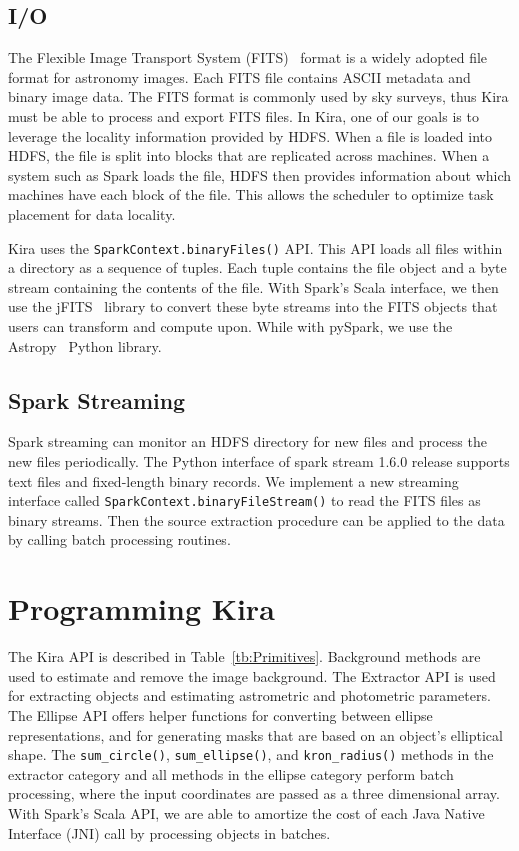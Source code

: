 \documentclass[10pt,journal,compsoc]{IEEEtran}
\begin{document}
\subsection{I/O}
\label{sec:Design-I/O}
The Flexible Image Transport System (FITS)~\cite{wells81} format is a widely adopted file format for astronomy
images. Each FITS file contains ASCII metadata and binary image data.
The FITS format is commonly used by sky surveys, thus Kira must be able to process and export FITS files.
In Kira, one of our goals is to leverage the locality information provided by HDFS. When a file is loaded into 
HDFS, the file is split into blocks that are replicated across machines. When a system such as Spark loads the file, 
HDFS then provides information about which machines have each block of the file. This allows the
scheduler to optimize task placement for data locality.

Kira uses the \texttt{SparkContext.binaryFiles()} API.
This API loads all files within a directory as a sequence of tuples. 
Each tuple contains the file object and a byte stream containing the contents of the file. 
With Spark's Scala interface, we then use the jFITS~\cite{jfits} library to convert these byte streams 
into the FITS objects that users can transform and compute upon. 
While with pySpark, we use the Astropy~\cite{astropy13} Python library.

\subsection{Spark Streaming}
\label{sec:Design-Streaming}
Spark streaming can monitor an HDFS directory for new files and process the new files periodically. 
The Python interface of spark stream 1.6.0 release supports text files and fixed-length binary records.
We implement a new streaming interface called \texttt{SparkContext.binaryFileStream()} to read the FITS
files as binary streams. 
Then the source extraction procedure can be applied to the data by calling batch processing routines.

\section{Programming Kira}
\label{sec:Programming}
The Kira API is described in Table~\ref{tb:Primitives}. 
Background methods are used to estimate and remove the image background. The Extractor
API is used for extracting objects and estimating astrometric and photometric parameters. The Ellipse API offers helper
functions for converting between ellipse representations, and for generating masks that are based on an object's elliptical
shape. The \texttt{sum\_circle()}, \texttt{sum\_ellipse()}, and \texttt{kron\_radius()} methods in the extractor category and all
methods in the ellipse category perform batch processing, where the input coordinates are passed as a three dimensional array. 
With Spark's Scala API, we are able to amortize the cost of each Java Native Interface (JNI) call by processing objects in batches.
\end{document}
